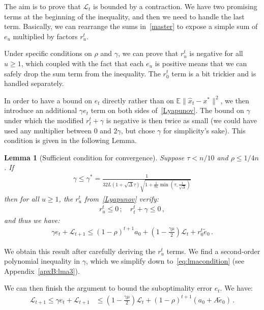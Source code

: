 \documentclass[twoside]{article}
\newcommand{\stepsize}{\gamma}
\newcommand{\strongconvex}{\mu}
\newcommand{\overlap}{\tau}
\newcommand{\contraction}{\rho}
\newcommand{\sparsity}{\Delta}
\newcommand{\lipschitz}{L}
\newcommand{\lyapunov}{\mathcal{L}}
\newcommand{\E}{\mathbb{E}}
\newtheorem{lemma}{Lemma}
\begin{document}
The aim is to prove that $\lyapunov_t$ is bounded by a contraction. 
We have two promising terms at the beginning of the inequality, and then we need to handle the last term.
Basically, we can rearrange the sums in~\eqref{master} to expose a simple sum of $e_u$ multiplied by factors $r_u^t$. 

Under specific conditions on $\contraction$ and $\stepsize$, we can prove that $r_u^t$ is negative for all $u \geq 1$, which coupled with the fact that each $e_u$ is positive means that we can safely drop the sum term from the inequality. 
The $r_0^t$ term is a bit trickier and is handled separately.

In order to have a bound on $e_t$ directly rather than on $\E \|\hat x_t - x^*\|^2$, we then introduce an additional $\stepsize e_t$ term on both sides of~\eqref{Lyapunov}.
The bound on $\stepsize$ under which the modified $r_t^t + \stepsize$ is negative is then twice as small (we could have used any multiplier between $0$ and $2\stepsize$, but chose $\stepsize$ for simplicity's sake).
This condition is given in the following Lemma.

\begin{lemma} [Sufficient condition for convergence]\label{lma:3}
Suppose $\overlap < n/10$ and $\contraction \leq 1/4n$. If 
\begin{align}\label{eq:lmacondition}
\stepsize \leq \stepsize^* = \frac{1}{32\lipschitz (1 + \sqrt{\sparsity} \overlap) \sqrt{1 + \frac{1}{8\kappa} \min(\overlap, \frac{1}{\sqrt{\sparsity}})}}
\end{align}
then for all $u \geq 1$, the $r_u^t$ from~\eqref{Lyapunov} verify:
\begin{align}
r_u^t \leq 0 \,; \quad r_t^t + \stepsize \leq 0 \,,
\end{align}
and thus we have:
\begin{align}
\stepsize  e_t + \lyapunov_{t+1} \leq (1 - \contraction)^{t+1}a_0 + (1-\frac{\stepsize\strongconvex}{2})\lyapunov_t + r_0^t \tilde e_0 \,.
\end{align}

\end{lemma}

We obtain this result after carefully deriving the $r_u^t$ terms. 
We find a second-order polynomial inequality in $\stepsize$, which we simplify down to~\eqref{eq:lmacondition} (see Appendix~\ref{apxB:lma3}).

We can then finish the argument to bound the suboptimality error $e_t$. We have:
\begin{align}
\lyapunov_{t+1} \leq
\stepsize e_t + \lyapunov_{t+1} 
&\leq (1-\frac{\stepsize\strongconvex}{2})\lyapunov_t  +(1 - \contraction)^{t+1} (a_0 + A \tilde e_0)  \, .
\end{align}
\end{document}

